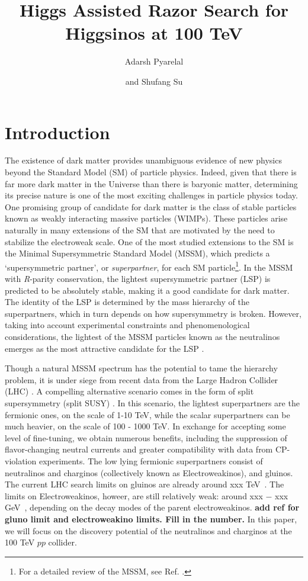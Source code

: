 \documentclass[a4paper,11pt]{article}
\title{Higgs Assisted Razor Search for Higgsinos at 100 TeV}
\author[a]{Adarsh Pyarelal}
\author[b]{and Shufang Su}
\affiliation[a]{School of Information, University of Arizona, Tucson, AZ 85718 , USA}
\affiliation[b]{Department of Physics, University of Arizona, Tucson, AZ 85718, USA}
\newcommand{\Shufang}[1]{{\bf\color{Maroon}  #1}}
\begin{document}
 
\maketitle
\flushbottom

\section{Introduction}
 
The existence of dark matter provides unambiguous evidence of new 
physics beyond the Standard Model (SM) of particle physics. Indeed, 
given that there is far more dark matter in the Universe than there 
is baryonic matter, determining its precise nature is one of the most 
exciting challenges in particle physics today.  One promising group 
of candidate for dark matter is the class of stable particles known as 
weakly interacting massive particles (WIMPs). These particles arise 
naturally in many extensions of the SM that are motivated by the need to
stabilize the electroweak scale. One of the most studied extensions
to the SM is the Minimal Supersymmetric Standard Model
(MSSM), which predicts a `supersymmetric partner', or \emph{superpartner}, 
for each SM particle\footnote{For a detailed review of the MSSM, see 
Ref. \citep{Martin:1997ns}.}. In the MSSM with \emph{R}-parity conservation, the 
lightest supersymmetric partner (LSP) is predicted to be absolutely 
stable, making it a good candidate for dark matter. The identity of 
the LSP is determined by the mass hierarchy of the superpartners, 
which in turn depends on how supersymmetry is broken.
However, taking into account experimental constraints and phenomenological 
considerations, the lightest of the  MSSM particles known as the 
neutralinos emerges as the most attractive candidate for the LSP \citep{Bertone:2004pz}. 

Though a natural MSSM spectrum has the potential to tame the hierarchy
problem, it is under siege from recent data from the Large Hadron
Collider (LHC) \cite{Aaboud:2018ujj, Sirunyan:2018vjp}. 
A compelling alternative scenario comes in the form of
split supersymmetry (split SUSY) \citep{Wells:2003tf,
ArkaniHamed:2004yi, Giudice:2004tc}. In this scenario, the lightest
superpartners are the fermionic ones, on the
scale of 1-10 TeV, while the scalar superpartners can be much heavier,
on the scale of 100 - 1000 TeV. In exchange for accepting some level of
fine-tuning, we obtain numerous benefits, including the suppression of
flavor-changing neutral currents and greater compatibility with data
from CP-violation experiments.  The low lying 
fermionic superpartners consist of neutralinos and charginos (collectively known as Electroweakinos), and gluinos. The current LHC search limits on gluinos are already around xxx TeV~\cite{}.  The limits on Electroweakinos, howeer, are still relatively weak: around xxx $-$ xxx GeV~\cite{}, depending on the decay modes of the parent electroweakinos.  \Shufang{add ref for gluno limit and electroweakino limits.  Fill in the number.} In this paper, we will focus on the discovery potential of the neutralinos and charginos at the 100 TeV $pp$ collider. 
 
\end{document}

